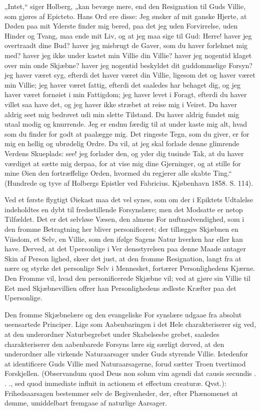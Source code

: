 \documentclass[12pt]{book}
\newcommand{\opage}[1]{\marginnote{\footnotesize\textit{[#1]}}}
\begin{document}
„Intet,“ siger Holberg, „kan bevæge mere, end den
Resignation til Guds Villie, som gjøres af Epicteto.
Hans Ord ere disse: Jeg ønsker af mit ganske Hjerte,
at Døden paa mit Yderste finder mig bered, paa
det jeg uden Forvirrelse, uden Hinder og Tvang, maa
ende mit Liv, og at jeg maa sige til Gud: Herre! haver
jeg overtraadt dine Bud? haver jeg misbrugt de Gaver,
som du haver forlehnet mig med? haver jeg ikke under\-%
kastet min Villie din Villie? haver jeg nogentid klaget
over min onde Skjæbne? haver jeg nogentid beskyldet
dit guddommelige Forsyn? jeg haver været syg, efterdi
det haver været din Villie, ligesom det og haver været
min Villie; jeg haver været fattig, efterdi det saaledes
har behaget dig, og jeg haver været fornøiet i min
\opage{221}\setcounter{footnote}{0}%
Fattigdom; jeg haver levet i Foragt, efterdi du haver
villet saa have det, og jeg haver ikke stræbet at reise
mig i Veiret. Du haver aldrig seet mig bedrøvet udi
min slette Tilstand. Du haver aldrig fundet mig utaal\-%
modig og knurrende. Jeg er endnu færdig til at under\-%
kaste mig alt, hvad som du finder for godt at paalægge
mig. Det ringeste Tegn, som du giver, er for mig en
hellig og ubrødelig Ordre. Du vil, at jeg skal forlade
denne glimrende Verdens Skueplads: see! jeg forlader
den, og yder dig tusinde Tak, at du haver værdiget at
sætte mig derpaa, for at vise mig dine Gjerninger, og at
stille for mine Øien den fortræffelige Orden, hvormed
du regjerer alle skabte Ting.“ (Hundrede og tyve af
Holbergs Epistler ved Fabricius. Kjøbenhavn 1858.
S. 114).

Ved et første flygtigt Øiekast maa det vel synes,
som om der i Epiktets Udtalelse indeholdtes en dybt til\-%
fredsstillende Forsynslære; men det Modsatte er netop
Tilfældet. Det er det selvløse Væsen, den almene For\-%
nuftnødvendighed, som i den fromme Betragtning her
bliver personificeret; der tillægges Skjæbnen en Viisdom,
et Selv, en Villie, som den ifølge Sagens Natur hverken
har eller kan have. Derved, at det Upersonlige i Ver\-%
densstyrelsen paa denne Maade antager Skin af Person\-%
lighed, skeer det just, at den fromme Resignation, langt
fra at nære og styrke det personlige Selv i Mennesket,
fortærer Personlighedens Kjærne. Den Fromme vil, hvad
den personificerede Skjæbne vil; ved at gjøre sin Villie
til Eet med Skjæbnevillien offrer han Personlighedens
ædleste Kræfter paa det Upersonlige.

Den fromme Skjæbnelære og den evangeliske For\-%
synslære udgaae fra absolut ueensartede Principer. Lige\-%
som Aabenbaringen i det Hele charakteriserer sig ved,
at den underordner Naturbegrebet under Skabelsesbe\-%
\opage{222}\setcounter{footnote}{0}%
grebet, saaledes charakteriserer den aabenbarede Forsyns\-%
lære sig særligt derved, at den underordner alle virkende
Naturaarsager under Guds styrende Villie. Istedenfor
at identificere Guds Villie med Naturaarsagerne, forud\-%
sætter Troen tvertimod Forskjellen. (Observandum quod
Deus non solum vim agendi dat causis secundis . . ., sed
quod immediate influit in actionem et effectum creaturæ.
Qvst.): Frihedsaarsagen bestemmer selv de Begivenheder,
der, efter Phænomenet at dømme, umiddelbart fremgaae
af naturlige Aarsager.
\end{document}
